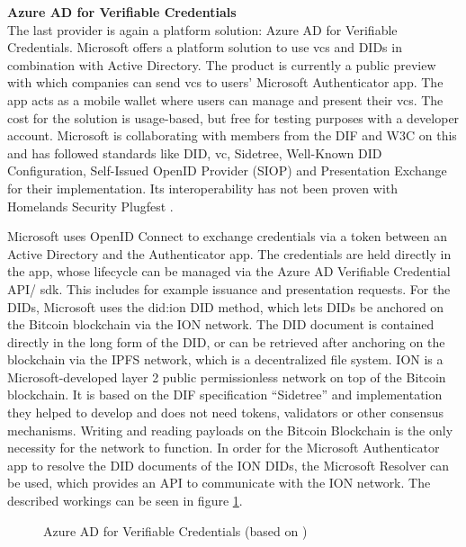     \textbf{Azure AD for Verifiable Credentials}\\
    The last provider is again a platform solution: Azure AD for Verifiable Credentials. Microsoft offers a platform solution to use \acp{vc} and \acp{DID} in combination with Active Directory. The product is currently a public preview with which companies can send \acp{vc} to users' Microsoft Authenticator app. The app acts as a mobile wallet where users can manage and present their \acp{vc}. The cost for the solution is usage-based, but free for testing purposes with a developer account. Microsoft is collaborating with members from the \ac{DIF} and \ac{W3C} on this and has followed standards like \ac{DID}, \ac{vc}, Sidetree, Well-Known \ac{DID} Configuration, Self-Issued OpenID Provider (SIOP) and Presentation Exchange for their implementation. Its interoperability has not been proven with Homelands Security Plugfest \cite{homeland_security_interoperability_2021}. \cite{neira_introduction_2021, simons_announcing_2021, microsoft_identitatsnachweis-losungen_2021}
    
    Microsoft uses OpenID Connect to exchange credentials via a token between an Active Directory and the Authenticator app. The credentials are held directly in the app, whose lifecycle can be managed via the Azure AD Verifiable Credential API/ \ac{sdk}. This includes for example issuance and presentation requests. For the \acp{DID}, Microsoft uses the did:ion \ac{DID} method, which lets \acp{DID} be anchored on the Bitcoin blockchain via the ION network. The \ac{DID} document is contained directly in the long form of the \ac{DID}, or can be retrieved after anchoring on the blockchain via the IPFS network, which is a decentralized file system. ION is a Microsoft-developed layer 2 public permissionless network on top of the Bitcoin blockchain. It is based on the \ac{DIF} specification “Sidetree” and implementation they helped to develop and does not need tokens, validators or other consensus mechanisms. Writing and reading payloads on the Bitcoin Blockchain is the only necessity for the network to function. In order for the Microsoft Authenticator app to resolve the \ac{DID} documents of the ION \acp{DID}, the Microsoft Resolver can be used, which provides an API to communicate with the ION network. The described workings can be seen in figure \ref{figure: azure ad}. \cite{neira_introduction_2021}
    
    \begin{figure}[ht]
	    \centering    	   
	    \makebox[\textwidth]{}
        \caption[Azure AD for Verifiable Credentials]{Azure AD for Verifiable Credentials (based on \cite{neira_introduction_2021})}
        \label{figure: azure ad}
    \end{figure}
    
